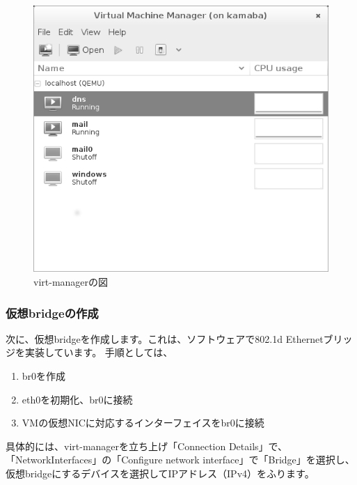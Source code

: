 \documentclass[mingoth,a4paper]{jsarticle}
\begin{document}
\begin{figure}[!h]
\centering
\includegraphics{image201404/virt-manager_mono.png}
\caption{virt-managerの図}
\end{figure}

\subsubsection{仮想bridgeの作成}
次に、仮想bridgeを作成します。これは、ソフトウェアで802.1d Ethernetブリッジを実装しています。
手順としては、
\begin{enumerate}
\item br0を作成
\item eth0を初期化、br0に接続
\item VMの仮想NICに対応するインターフェイスをbr0に接続
\end{enumerate}

具体的には、virt-managerを立ち上げ「Connection Details」で、「NetworkInterfaces」の「Configure network interface」で「Bridge」を選択し、仮想bridgeにするデバイスを選択してIPアドレス（IPv4）をふります。
\end{document}

